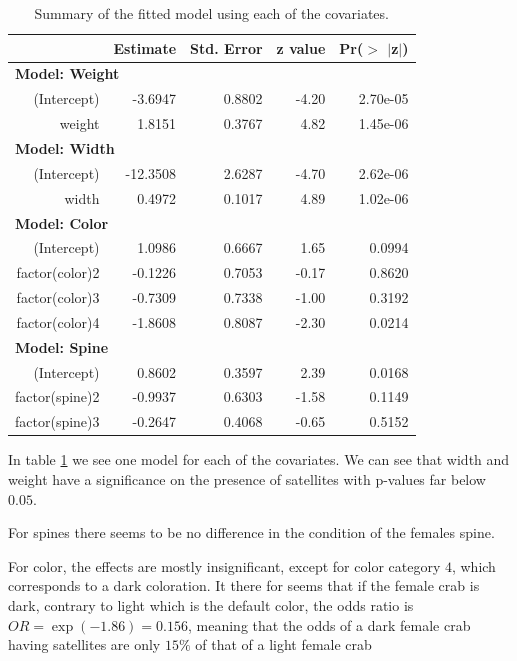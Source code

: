 \documentclass[a4paper,norsk, 10pt]{article}
\begin{document}
\begin{table}[!htb]
\centering
\begin{tabular}{rrrrr}
  \hline
 & Estimate & Std. Error & z value & Pr($>$ $|$z$|$) \\ 
  \hline
  \multicolumn{5}{l}{\textbf{Model: Weight}}\\
(Intercept) & -3.6947 & 0.8802 & -4.20 & 2.70e-05 \\ 
  weight & 1.8151 & 0.3767 & 4.82 & 1.45e-06 \\ 
   \hline
   \multicolumn{5}{l}{\textbf{Model: Width}}\\
   (Intercept) & -12.3508 & 2.6287 & -4.70 & 2.62e-06 \\ 
  width & 0.4972 & 0.1017 & 4.89 & 1.02e-06 \\ 
   \hline
   \multicolumn{5}{l}{\textbf{Model: Color}}\\
   (Intercept) & 1.0986 & 0.6667 & 1.65 & 0.0994 \\ 
  factor(color)2 & -0.1226 & 0.7053 & -0.17 & 0.8620 \\ 
  factor(color)3 & -0.7309 & 0.7338 & -1.00 & 0.3192 \\ 
  factor(color)4 & -1.8608 & 0.8087 & -2.30 & 0.0214 \\ 
   \hline
   \multicolumn{5}{l}{\textbf{Model: Spine}}\\
   (Intercept) & 0.8602 & 0.3597 & 2.39 & 0.0168 \\ 
  factor(spine)2 & -0.9937 & 0.6303 & -1.58 & 0.1149 \\ 
  factor(spine)3 & -0.2647 & 0.4068 & -0.65 & 0.5152 \\ 
   \hline
\end{tabular}
\caption{Summary of the fitted model using each of the covariates.}
\label{tab:crabs_each}
\end{table}

In table \ref{tab:crabs_each} we see one model for each of the covariates. We can see that width and weight have a significance on the presence of satellites with p-values far below $0.05$. 

For spines there seems to be no difference in the condition of the females spine. 

For color, the effects are mostly insignificant, except for color category $4$, which corresponds to a dark coloration. It there for seems that if the female crab is dark, contrary to light which is the default color, the odds ratio is $OR = \exp(-1.86) = 0.156$, meaning that the odds of a dark female crab having satellites are only $15\%$ of that of a light female crab 
\end{document}
